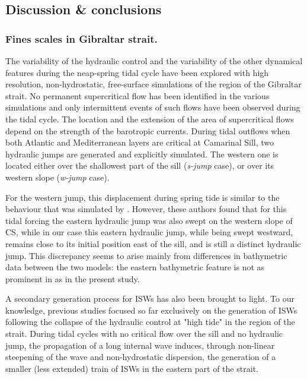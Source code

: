 \subsection{Discussion \& conclusions}
\subsubsection{Fines scales in Gibraltar strait.}
The variability of the hydraulic control and the variability of the other dynamical features during the neap-spring tidal cycle have been explored with high resolution, non-hydrostatic, free-surface simulations of the region of the Gibraltar strait. No permanent supercritical flow has been identified in the various simulations and only intermittent events of such flows have been observed during the tidal cycle. The location and the extension of the area of supercritical flows depend on the strength of the barotropic currents. During tidal outflows when both Atlantic and Mediterranean layers are critical at Camarinal Sill, two hydraulic jumps are generated and explicitly simulated. The western one is located either over the shallowest part of the sill (\textit{s-jump} case), or over its western slope (\textit{w-jump} case). 

For the western jump, this displacement during spring tide is similar to the behaviour that was simulated by \citet{sanchez-garrido_2011}. However, these authors found that for this tidal forcing the eastern hydraulic jump was also swept on the western slope of CS, while in our case this eastern hydraulic jump, while being swept westward, remains close to its initial position east of the sill, and is still a distinct hydraulic jump. This discrepancy seems to arise mainly from differences in bathymetric data between the two models: the eastern bathymetric feature is not as prominent in \citet{sanchez-garrido_2011} as in the present study.

A secondary generation process for ISWs has also been brought to light. To our knowledge, previous studies focused so far exclusively on the generation of ISWs following the collapse of the hydraulic control at "high tide" in the region of the strait. During tidal cycles with no critical flow over the sill and no hydraulic jump, the propagation of a long internal wave induces, through non-linear steepening of the wave and non-hydrostatic dispersion, the generation of a smaller (less extended) train of ISWs in the eastern part of the strait.

